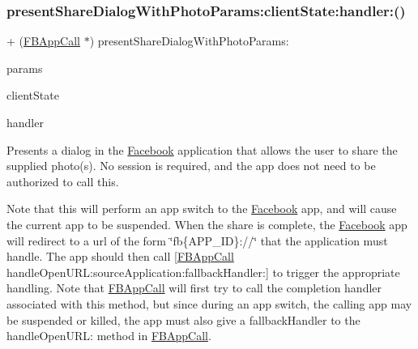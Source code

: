 \subsubsection{\texorpdfstring{present\+Share\+Dialog\+With\+Photo\+Params\+:client\+State\+:handler\+:()}{presentShareDialogWithPhotoParams:clientState:handler:()}\hspace{0.1cm}{\footnotesize\ttfamily [4/5]}}
{\footnotesize\ttfamily + (\hyperlink{interfaceFBAppCall}{F\+B\+App\+Call} $\ast$) present\+Share\+Dialog\+With\+Photo\+Params\+: \begin{DoxyParamCaption}\item[{(\hyperlink{interfaceFBPhotoParams}{F\+B\+Photo\+Params} $\ast$)}]{params }\item[{clientState:(N\+S\+Dictionary $\ast$)}]{client\+State }\item[{handler:(F\+B\+Dialog\+App\+Call\+Completion\+Handler)}]{handler }\end{DoxyParamCaption}}

Presents a dialog in the \hyperlink{interfaceFacebook}{Facebook} application that allows the user to share the supplied photo(s). No session is required, and the app does not need to be authorized to call this.

Note that this will perform an app switch to the \hyperlink{interfaceFacebook}{Facebook} app, and will cause the current app to be suspended. When the share is complete, the \hyperlink{interfaceFacebook}{Facebook} app will redirect to a url of the form \char`\"{}fb\{\+A\+P\+P\+\_\+\+I\+D\}\+://\char`\"{} that the application must handle. The app should then call \mbox{[}\hyperlink{interfaceFBAppCall}{F\+B\+App\+Call} handle\+Open\+U\+R\+L\+:source\+Application\+:fallback\+Handler\+:\mbox{]} to trigger the appropriate handling. Note that \hyperlink{interfaceFBAppCall}{F\+B\+App\+Call} will first try to call the completion handler associated with this method, but since during an app switch, the calling app may be suspended or killed, the app must also give a fallback\+Handler to the handle\+Open\+U\+RL\+: method in \hyperlink{interfaceFBAppCall}{F\+B\+App\+Call}.


